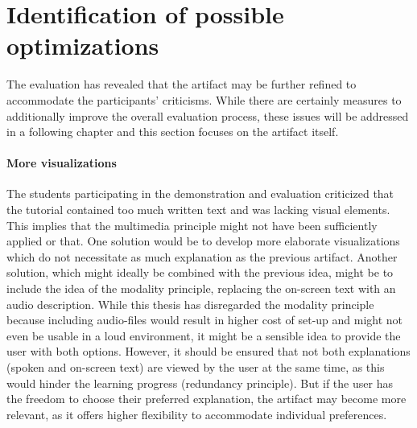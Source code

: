 \section{Identification of possible optimizations} \label{sec:Optimizations}
The evaluation has revealed that the artifact may be further refined to accommodate the participants' criticisms. While there are certainly measures to additionally improve the overall evaluation process, these issues will be addressed in a following chapter and this section focuses on the artifact itself.

\paragraph{More visualizations} The students participating in the demonstration and evaluation criticized that the tutorial contained too much written text and was lacking visual elements. This implies that the multimedia principle might not have been sufficiently applied or that. One solution would be to develop more elaborate visualizations which do not necessitate as much explanation as the previous artifact. Another solution, which might ideally be combined with the previous idea, might be to include the idea of the modality principle, replacing the on-screen text with an audio description. While this thesis has disregarded the modality principle because including audio-files would result in higher cost of set-up and might not even be usable in a loud environment, it might be a sensible idea to provide the user with both options. However, it should be ensured that not both explanations (spoken and on-screen text) are viewed by the user at the same time, as this would hinder the learning progress (redundancy principle). But if the user has the freedom to choose their preferred explanation, the artifact may become more relevant, as it offers higher flexibility to accommodate individual preferences.


